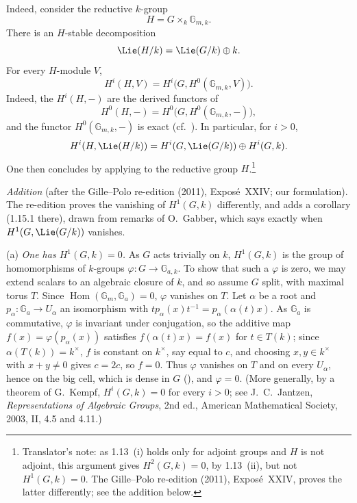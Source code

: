 Indeed, consider the reductive \(k\)-group
\[
  H=G\times_k\mathbb G_{m,k}.
\]
There is an \(H\)-stable decomposition
\[
  \Lie(H/k)=\Lie(G/k)\oplus k.
\]
For every \(H\)-module \(V\),
\[
  H^i(H,V)=H^i\bigl(G,H^0(\mathbb G_{m,k},V)\bigr).
\]
Indeed, the \(H^i(H,-)\) are the derived functors of
\[
  H^0(H,-)
  =H^0\bigl(G,H^0(\mathbb G_{m,k},-)\bigr),
\]
and the functor \(H^0(\mathbb G_{m,k},-)\) is exact
(cf.\ ). In particular, for \(i>0\),
\[
  H^i(H,\Lie(H/k))
  =
  H^i(G,\Lie(G/k))\oplus H^i(G,k).
\]
One then concludes by applying  to the reductive group \(H\).\footnote{Translator's
note: as 1.13~(i) holds only for adjoint groups and \(H\) is not adjoint, this argument gives
\(H^2(G,k)=0\), by 1.13~(ii), but not \(H^1(G,k)=0\). The Gille--Polo re-edition (2011),
Exposé~XXIV, proves the latter differently; see the addition below.}

\medskip\noindent
\emph{Addition} (after the Gille--Polo re-edition (2011), Exposé~XXIV; our formulation). The
re-edition proves the vanishing of \(H^1(G,k)\) differently, and adds a corollary (1.15.1 there),
drawn from remarks of O.~Gabber, which says exactly when \(H^1(G,\Lie(G/k))\) vanishes.

(a) \emph{One has \(H^1(G,k)=0\).} As \(G\) acts trivially on \(k\), \(H^1(G,k)\) is the group of
homomorphisms of \(k\)-groups \(\varphi\colon G\to\mathbb G_{a,k}\). To show that such a
\(\varphi\) is zero, we may extend scalars to an algebraic closure of \(k\), and so assume \(G\)
split, with maximal torus \(T\). Since \(\operatorname{Hom}(\mathbb G_m,\mathbb G_a)=0\),
\(\varphi\) vanishes on \(T\). Let \(\alpha\) be a root and \(p_\alpha\colon\mathbb G_a\to U_\alpha\)
an isomorphism with \(tp_\alpha(x)t^{-1}=p_\alpha(\alpha(t)x)\). As \(\mathbb G_a\) is commutative,
\(\varphi\) is invariant under conjugation, so the additive map \(f(x)=\varphi(p_\alpha(x))\)
satisfies \(f(\alpha(t)x)=f(x)\) for \(t\in T(k)\); since \(\alpha(T(k))=k^\times\), \(f\) is
constant on \(k^\times\), say equal to \(c\), and choosing \(x,y\in k^\times\) with \(x+y\neq0\) gives
\(c=2c\), so \(f=0\). Thus \(\varphi\) vanishes on \(T\) and on every \(U_\alpha\), hence on the big
cell, which is dense in \(G\) \textup{()}, and
\(\varphi=0\). (More generally, by a theorem of G.~Kempf, \(H^i(G,k)=0\) for every \(i>0\); see
J.~C.~Jantzen, \emph{Representations of Algebraic Groups}, 2nd ed., American Mathematical
Society, 2003, II, 4.5 and 4.11.)

